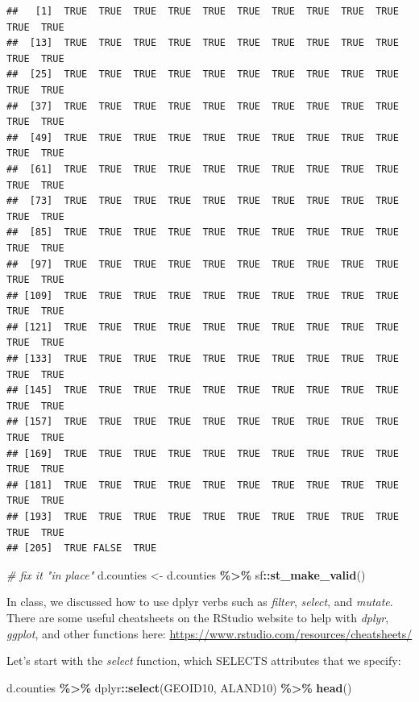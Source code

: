 \documentclass[]{article}
\newenvironment{Shaded}{\begin{snugshade}}{\end{snugshade}}
\newcommand{\CommentTok}[1]{\textcolor[rgb]{0.56,0.35,0.01}{\textit{#1}}}
\newcommand{\FunctionTok}[1]{\textcolor[rgb]{0.13,0.29,0.53}{\textbf{#1}}}
\newcommand{\NormalTok}[1]{#1}
\newcommand{\OtherTok}[1]{\textcolor[rgb]{0.56,0.35,0.01}{#1}}
\newcommand{\SpecialCharTok}[1]{\textcolor[rgb]{0.81,0.36,0.00}{\textbf{#1}}}
\begin{document}
\begin{verbatim}
##   [1]  TRUE  TRUE  TRUE  TRUE  TRUE  TRUE  TRUE  TRUE  TRUE  TRUE  TRUE  TRUE
##  [13]  TRUE  TRUE  TRUE  TRUE  TRUE  TRUE  TRUE  TRUE  TRUE  TRUE  TRUE  TRUE
##  [25]  TRUE  TRUE  TRUE  TRUE  TRUE  TRUE  TRUE  TRUE  TRUE  TRUE  TRUE  TRUE
##  [37]  TRUE  TRUE  TRUE  TRUE  TRUE  TRUE  TRUE  TRUE  TRUE  TRUE  TRUE  TRUE
##  [49]  TRUE  TRUE  TRUE  TRUE  TRUE  TRUE  TRUE  TRUE  TRUE  TRUE  TRUE  TRUE
##  [61]  TRUE  TRUE  TRUE  TRUE  TRUE  TRUE  TRUE  TRUE  TRUE  TRUE  TRUE  TRUE
##  [73]  TRUE  TRUE  TRUE  TRUE  TRUE  TRUE  TRUE  TRUE  TRUE  TRUE  TRUE  TRUE
##  [85]  TRUE  TRUE  TRUE  TRUE  TRUE  TRUE  TRUE  TRUE  TRUE  TRUE  TRUE  TRUE
##  [97]  TRUE  TRUE  TRUE  TRUE  TRUE  TRUE  TRUE  TRUE  TRUE  TRUE  TRUE  TRUE
## [109]  TRUE  TRUE  TRUE  TRUE  TRUE  TRUE  TRUE  TRUE  TRUE  TRUE  TRUE  TRUE
## [121]  TRUE  TRUE  TRUE  TRUE  TRUE  TRUE  TRUE  TRUE  TRUE  TRUE  TRUE  TRUE
## [133]  TRUE  TRUE  TRUE  TRUE  TRUE  TRUE  TRUE  TRUE  TRUE  TRUE  TRUE  TRUE
## [145]  TRUE  TRUE  TRUE  TRUE  TRUE  TRUE  TRUE  TRUE  TRUE  TRUE  TRUE  TRUE
## [157]  TRUE  TRUE  TRUE  TRUE  TRUE  TRUE  TRUE  TRUE  TRUE  TRUE  TRUE  TRUE
## [169]  TRUE  TRUE  TRUE  TRUE  TRUE  TRUE  TRUE  TRUE  TRUE  TRUE  TRUE  TRUE
## [181]  TRUE  TRUE  TRUE  TRUE  TRUE  TRUE  TRUE  TRUE  TRUE  TRUE  TRUE  TRUE
## [193]  TRUE  TRUE  TRUE  TRUE  TRUE  TRUE  TRUE  TRUE  TRUE  TRUE  TRUE  TRUE
## [205]  TRUE FALSE  TRUE
\end{verbatim}

\begin{Shaded}
\begin{Highlighting}[]
\CommentTok{\# fix it "in place"}
\NormalTok{d.counties }\OtherTok{\textless{}{-}}\NormalTok{ d.counties }\SpecialCharTok{\%\textgreater{}\%}\NormalTok{ sf}\SpecialCharTok{::}\FunctionTok{st\_make\_valid}\NormalTok{()}
\end{Highlighting}
\end{Shaded}

In class, we discussed how to use dplyr verbs such as \emph{filter},
\emph{select}, and \emph{mutate}. There are some useful cheatsheets on
the RStudio website to help with \emph{dplyr}, \emph{ggplot}, and other
functions here: \url{https://www.rstudio.com/resources/cheatsheets/}

Let's start with the \emph{select} function, which SELECTS attributes
that we specify:

\begin{Shaded}
\begin{Highlighting}[]
\NormalTok{d.counties }\SpecialCharTok{\%\textgreater{}\%}\NormalTok{ dplyr}\SpecialCharTok{::}\FunctionTok{select}\NormalTok{(GEOID10, ALAND10) }\SpecialCharTok{\%\textgreater{}\%} \FunctionTok{head}\NormalTok{()}
\end{Highlighting}
\end{Shaded}
\end{document}
